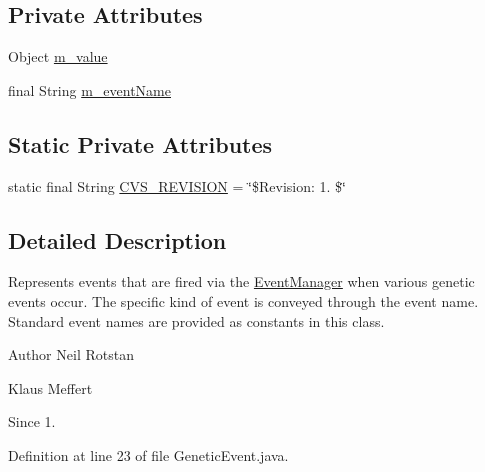 \subsection*{Private Attributes}
\begin{DoxyCompactItemize}
\item 
Object \hyperlink{classorg_1_1jgap_1_1event_1_1_genetic_event_a1a6297ab19f2f7b68ddbc3d34d803998}{m\-\_\-value}
\item 
final String \hyperlink{classorg_1_1jgap_1_1event_1_1_genetic_event_a6ceccc2dd0c9992e451a173599a54914}{m\-\_\-event\-Name}
\end{DoxyCompactItemize}
\subsection*{Static Private Attributes}
\begin{DoxyCompactItemize}
\item 
static final String \hyperlink{classorg_1_1jgap_1_1event_1_1_genetic_event_ae07001087ce2653d2861724f533a4bbc}{C\-V\-S\-\_\-\-R\-E\-V\-I\-S\-I\-O\-N} = \char`\"{}\$Revision\-: 1. \$\char`\"{}
\end{DoxyCompactItemize}


\subsection{Detailed Description}
Represents events that are fired via the \hyperlink{classorg_1_1jgap_1_1event_1_1_event_manager}{Event\-Manager} when various genetic events occur. The specific kind of event is conveyed through the event name. Standard event names are provided as constants in this class.

\begin{DoxyAuthor}{Author}
Neil Rotstan 

Klaus Meffert 
\end{DoxyAuthor}
\begin{DoxySince}{Since}
1. 
\end{DoxySince}


Definition at line 23 of file Genetic\-Event.\-java.



